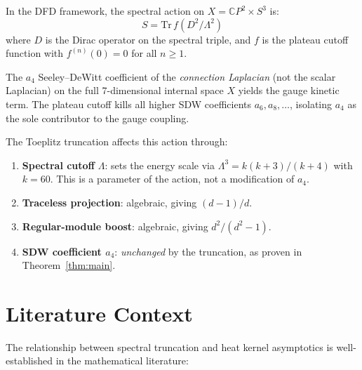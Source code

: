 \documentclass[12pt,a4paper]{article}
\begin{document}
In the DFD framework, the spectral action on $X = \mathbb{C}P^2 \times S^3$ is:
\begin{equation}
S = \mathrm{Tr}\,f(D^2/\Lambda^2)
\end{equation}
where $D$ is the Dirac operator on the spectral triple, and $f$ is the
plateau cutoff function with $f^{(n)}(0) = 0$ for all $n \geq 1$.

The $a_4$ Seeley--DeWitt coefficient of the \emph{connection Laplacian}
(not the scalar Laplacian) on the full 7-dimensional internal space
$X$ yields the gauge kinetic term.  The plateau cutoff kills all higher
SDW coefficients $a_6, a_8, \ldots$, isolating $a_4$ as the sole
contributor to the gauge coupling.

The Toeplitz truncation affects this action through:
\begin{enumerate}
\item \textbf{Spectral cutoff} $\Lambda$: sets the energy scale via
  $\Lambda^3 = k(k+3)/(k+4)$ with $k = 60$.  This is a parameter of
  the action, not a modification of $a_4$.

\item \textbf{Traceless projection}: algebraic, giving $(d-1)/d$.

\item \textbf{Regular-module boost}: algebraic, giving $d^2/(d^2-1)$.

\item \textbf{SDW coefficient $a_4$}: \emph{unchanged} by the truncation,
  as proven in Theorem~\ref{thm:main}.
\end{enumerate}

\section{Literature Context}
\label{sec:literature}

The relationship between spectral truncation and heat kernel asymptotics
is well-established in the mathematical literature:
\end{document}
